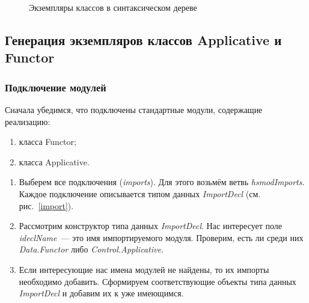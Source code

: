 \begin{figure}[h]
\caption{Экземпляры классов в синтаксическом дереве}\label{filter}
\end{figure}

\subsection{Генерация экземпляров классов Applicative и Functor}
\subsubsection{Подключение модулей}
Сначала убедимся, что подключены стандартные модули, содержащие реализацию:
    \begin{enumerate}[1)]
        \item класса Functor;
        \item класса Applicative.
    \end{enumerate}

\begin{enumerate}
\item Выберем все подключения (\textit{imports}). Для этого возьмём ветвь \textit{hsmodImports}. Каждое подключение описывается типом данных \textit{ImportDecl} (см. рис.~\ref{import}).
\item Рассмотрим конструктор типа данных \textit{ImportDecl}. Нас интересует поле \textit{ideclName}~--- это имя импортируемого модуля. Проверим, есть ли среди них \textit{Data.Functor} либо \textit{Control.Applicative}.
\item Если интересующие нас имена модулей не найдены, то их импорты необходимо добавить. Сформируем соответствующие объекты типа данных \textit{ImportDecl} и добавим их к уже имеющимся.
\end{enumerate}


